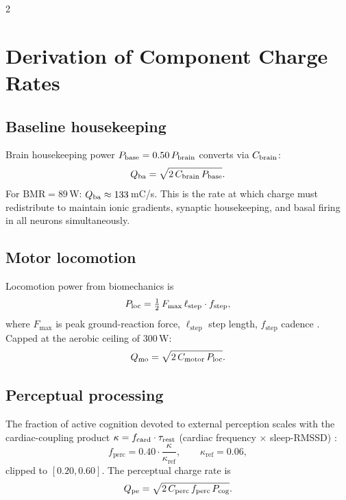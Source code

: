 \begin{multicols}{2}

\section{Derivation of Component Charge Rates}
\label{sec:ch07-components}

\subsection{Baseline housekeeping}

Brain housekeeping power $P_{\mathrm{base}} = 0.50\,P_{\mathrm{brain}}$ converts via $C_{\mathrm{brain}}$:
\begin{equation}
  Q_{\mathrm{ba}} = \sqrt{2\,C_{\mathrm{brain}}\,P_{\mathrm{base}}}.
  \label{eq:ch07-Qba}
\end{equation}
For $\mathrm{BMR} = 89$\,W: $Q_{\mathrm{ba}} \approx 133$\,mC/s.  This is the
rate at which charge must redistribute to maintain ionic gradients,
synaptic housekeeping, and basal firing in all neurons simultaneously.

\subsection{Motor locomotion}

Locomotion power from biomechanics is
\begin{equation}
  P_{\mathrm{loc}} = \tfrac{1}{2}\,F_{\max}\,\ell_{\mathrm{step}}\cdot f_{\mathrm{step}},
  \label{eq:ch07-Ploc}
\end{equation}
where $F_{\max}$ is peak ground-reaction force, $\ell_{\mathrm{step}}$ step
length, $f_{\mathrm{step}}$ cadence \citep{cavagna1977,kram1990}.  Capped at
the aerobic ceiling of $300$\,W:
\begin{equation}
  Q_{\mathrm{mo}} = \sqrt{2\,C_{\mathrm{motor}}\,P_{\mathrm{loc}}}.
  \label{eq:ch07-Qmo}
\end{equation}

\subsection{Perceptual processing}

The fraction of active cognition devoted to external perception scales with
the cardiac-coupling product $\kappa = f_{\mathrm{card}}\cdot\tau_{\mathrm{rest}}$ (cardiac
frequency $\times$ sleep-RMSSD) \citep{critchley2005,saper2002}:
\begin{equation}
  f_{\mathrm{perc}} = 0.40\cdot\frac{\kappa}{\kappa_{\mathrm{ref}}},
  \qquad \kappa_{\mathrm{ref}} = 0.06,
  \label{eq:ch07-fperc}
\end{equation}
clipped to $[0.20, 0.60]$.  The perceptual charge rate is
\begin{equation}
  Q_{\mathrm{pe}} = \sqrt{2\,C_{\mathrm{perc}}\,f_{\mathrm{perc}}\,P_{\mathrm{cog}}}.
  \label{eq:ch07-Qpe}
\end{equation}


\end{multicols}
